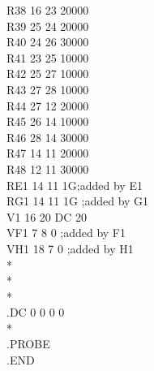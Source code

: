 \documentclass{article}
\begin{document}
R38 16 23 20000\\
R39 25 24 20000\\
R40 24 26 30000\\
R41 23 25 10000\\
R42 25 27 10000\\
R43 27 28 10000\\
R44 27 12 20000\\
R45 26 14 10000\\
R46 28 14 30000\\
R47 14 11 20000\\
R48 12 11 30000\\
RE1 14 11 1G;added by E1\\
RG1 14 11 1G ;added by G1\\
V1 16 20 DC 20\\
VF1 7 8 0 ;added by F1\\
VH1 18 7 0 ;added by H1\\
*\\

*\\
*\\
.DC 0 0 0 0\\
*\\
.PROBE\\
.END\\
\end{document}
